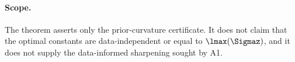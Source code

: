 \documentclass[../main.tex]{subfiles}
\begin{document}
\paragraph{Scope.}
The theorem asserts only the prior-curvature certificate.  It does not claim that the optimal
constants are data-independent or equal to \(\lmax(\Sigmaz)\), and it does not supply the
data-informed sharpening sought by A1.
\end{document}

